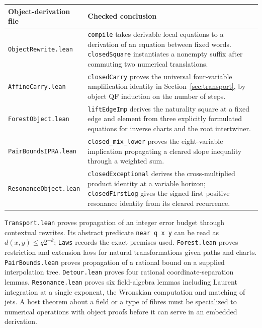\begin{center}\small
\begin{tabularx}{\linewidth}{@{}p{.287\linewidth}X@{}}
\toprule
\textbf{Object-derivation file} & \textbf{Checked conclusion} \\
\midrule
\texttt{ObjectRewrite.lean} & \texttt{compile} takes derivable local equations to a derivation of an equation between fixed words. \texttt{closedSquare} instantiates a nonempty suffix after commuting two numerical translations.\\[2pt]
\texttt{AffineCarry.lean} & \texttt{closedCarry} proves the universal four-variable amplification identity in Section~\ref{sec:transport}, by object QF induction on the number of steps.\\[2pt]
\texttt{ForestObject.lean} & \texttt{liftEdgeImp} derives the naturality square at a fixed edge and element from three explicitly formulated equations for inverse charts and the root intertwiner.\\[2pt]
\texttt{PairBoundsIPRA.lean} & \texttt{closed\_mix\_lower} proves the eight-variable implication propagating a cleared slope inequality through a weighted sum.\\[2pt]
\texttt{ResonanceObject.lean} & \texttt{closedExceptional} derives the cross-multiplied product identity at a variable horizon; \texttt{closedFirstLog} gives the signed first positive resonance identity from its cleared recurrence.\\
\bottomrule
\end{tabularx}
\end{center}

\noindent\texttt{Transport.lean} proves propagation of an integer error budget through contextual rewrites. Its abstract predicate \texttt{near q x y} can be read as $d(x,y)\le q2^{-k}$; \texttt{Laws} records the exact premises used. \texttt{Forest.lean} proves restriction and extension laws for natural transformations given paths and charts. \texttt{PairBounds.lean} proves propagation of a rational bound on a supplied interpolation tree. \texttt{Detour.lean} proves four rational coordinate-separation lemmas. \texttt{Resonance.lean} proves six field-algebra lemmas including Laurent integration at a single exponent, the Wronskian computation and matching of jets. A host theorem about a field or a type of fibres must be specialized to numerical operations with object proofs before it can serve in an embedded derivation.

